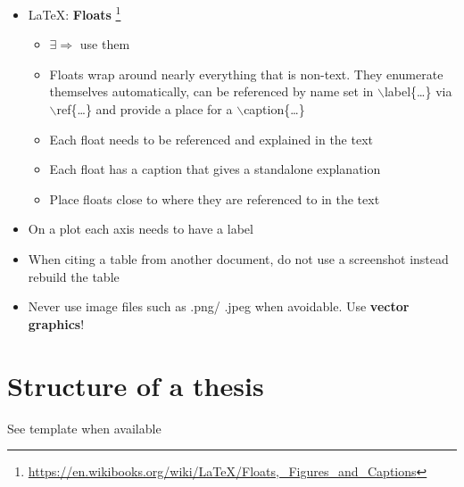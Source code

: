 \documentclass[nodate]{proc}
\begin{document}
\begin{itemize}
	\item \LaTeX: \textbf{Floats} \footnote{\href{https://en.wikibooks.org/wiki/LaTeX/Floats,_Figures_and_Captions}{https://en.wikibooks.org/wiki/LaTeX/Floats,\_Figures\_and\_Captions}}
	\begin{itemize}
		\item $\exists \Rightarrow$ use them
		\item Floats wrap around nearly everything that is non-text. They enumerate themselves automatically, can be referenced by name set in $\backslash$label\{\dots\} via $\backslash $ref\{\dots\} and provide a place for a $\backslash$caption\{\dots\}
		\item Each float needs to be referenced and explained in the text
		\item Each float has a caption that gives a standalone explanation
		\item Place floats close to where they are referenced to in the text
	\end{itemize}
	\item On a plot each axis needs to have a label
	\item When citing a table from another document, do not use a screenshot instead rebuild the table 
	\item Never use image files such as .png/ .jpeg when avoidable. Use \textbf{vector graphics}!
\end{itemize}

\section{Structure of a thesis}

See template when available
\end{document}
